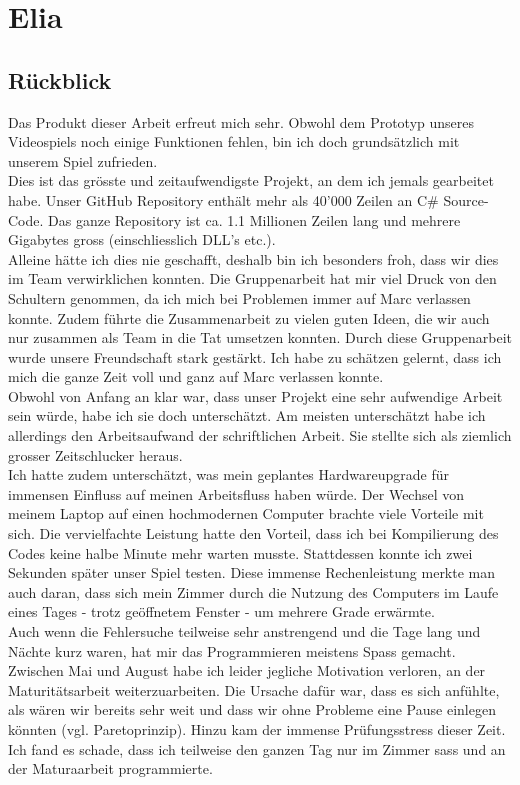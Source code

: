 \chapter{Elia}

\section{Rückblick}
Das Produkt dieser Arbeit erfreut mich sehr. Obwohl dem Prototyp unseres Videospiels noch einige Funktionen fehlen, bin ich doch grundsätzlich mit unserem Spiel zufrieden. \\
Dies ist das grösste und zeitaufwendigste Projekt, an dem ich jemals gearbeitet habe. Unser GitHub Repository enthält mehr als 40'000 Zeilen an C\# Source-Code.
Das ganze Repository ist ca. 1.1 Millionen Zeilen lang und mehrere Gigabytes gross (einschliesslich DLL's etc.). \\
Alleine hätte ich dies nie geschafft, deshalb bin ich besonders froh, dass wir dies im Team verwirklichen konnten. Die Gruppenarbeit hat mir viel Druck von den Schultern genommen, da ich mich bei Problemen immer auf Marc
verlassen konnte. Zudem führte die Zusammenarbeit zu vielen guten Ideen, die wir auch nur zusammen als Team in die Tat umsetzen konnten. Durch diese Gruppenarbeit wurde unsere Freundschaft stark gestärkt.
Ich habe zu schätzen gelernt, dass ich mich die ganze Zeit voll und ganz auf Marc verlassen konnte.\\
Obwohl von Anfang an klar war, dass unser Projekt eine sehr aufwendige Arbeit sein würde, habe ich sie doch unterschätzt. Am meisten unterschätzt habe ich allerdings den Arbeitsaufwand der schriftlichen Arbeit. Sie stellte sich als ziemlich grosser Zeitschlucker heraus. \\
Ich hatte zudem unterschätzt, was mein geplantes Hardwareupgrade für immensen Einfluss auf meinen Arbeitsfluss haben würde. Der Wechsel von meinem Laptop auf einen hochmodernen Computer brachte viele Vorteile mit sich.
Die vervielfachte Leistung hatte den Vorteil, dass ich bei Kompilierung des Codes keine halbe Minute mehr warten musste. Stattdessen konnte ich zwei Sekunden später unser Spiel testen.
Diese immense Rechenleistung merkte man auch daran, dass sich mein Zimmer durch die Nutzung des Computers im Laufe eines Tages - trotz geöffnetem Fenster - um mehrere Grade erwärmte.\\
Auch wenn die Fehlersuche teilweise sehr anstrengend und die Tage lang und Nächte kurz waren, hat mir das Programmieren meistens Spass gemacht. Zwischen Mai und August habe ich leider jegliche Motivation verloren, an
der Maturitätsarbeit weiterzuarbeiten. Die Ursache dafür war, dass es sich anfühlte, als wären wir bereits sehr weit und dass wir ohne Probleme eine Pause einlegen könnten (vgl. \gls{Paretoprinzip}). Hinzu kam der immense Prüfungsstress dieser Zeit.\\
Ich fand es schade, dass ich teilweise den ganzen Tag nur im Zimmer sass und an der Maturaarbeit programmierte. 


